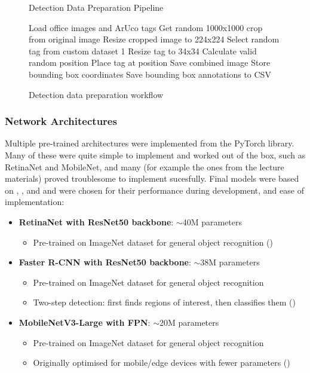 \documentclass[conference]{IEEEtran}
\begin{document}
\begin{figure}[H]
\begin{algorithm}[H]
\caption{Detection Data Preparation Pipeline}
\begin{algorithmic}[1]
\STATE Load office images and ArUco tags
    \STATE Get random 1000x1000 crop from original image
    \STATE Resize cropped image to 224x224
        \STATE Select random tag from custom dataset 1
        \STATE Resize tag to 34x34
        \STATE Calculate valid random position
        \STATE Place tag at position
        \STATE Save combined image
        \STATE Store bounding box coordinates
    \ENDFOR
\ENDFOR
\STATE Save bounding box annotations to CSV
\end{algorithmic}
\end{algorithm}
\caption{Detection data preparation workflow}
\end{figure}

\subsubsection{Network Architectures}

Multiple pre-trained architectures were implemented from the PyTorch library. Many of these were quite simple to implement and
worked out of the box, such as RetinaNet and MobileNet, and many (for example the ones from the lecture materials) proved troublesome to implement sucesfully.
Final models were based on \textcite{pytorch_retinanet}, \textcite{pytorch_fasterrcnn}, and \textcite{pytorch_mobilenet_rcnn} and were
chosen for their performance during development, and ease of implementation:

\begin{itemize}
    \item \textbf{RetinaNet with ResNet50 backbone}: $\sim$40M parameters
    \begin{itemize}
        \item Pre-trained on ImageNet dataset for general object recognition (\cite{pytorch_retinanet})
    \end{itemize}
    
    \item \textbf{Faster R-CNN with ResNet50 backbone}: $\sim$38M parameters
    \begin{itemize}
        \item Pre-trained on ImageNet dataset for general object recognition
        \item Two-step detection: first finds regions of interest, then classifies them (\cite{pytorch_fasterrcnn})
    \end{itemize}
    
    \item \textbf{MobileNetV3-Large with FPN}: $\sim$20M parameters
    \begin{itemize}
        \item Pre-trained on ImageNet dataset for general object recognition
        \item Originally optimised for mobile/edge devices with fewer parameters (\cite{pytorch_mobilenet_rcnn})
    \end{itemize}
\end{itemize}
\end{document}
